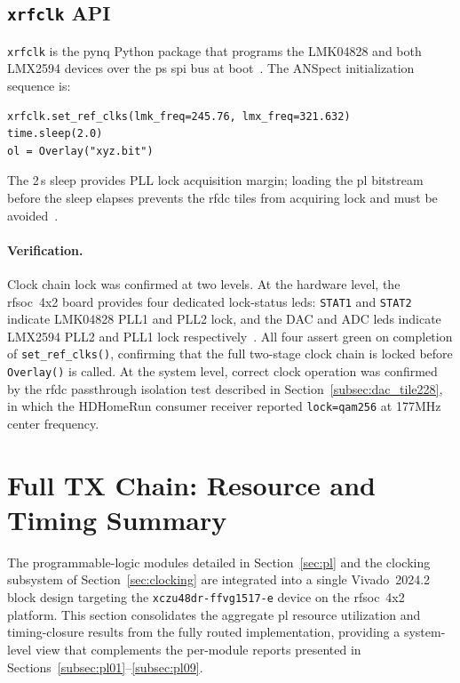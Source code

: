\clearpage
\subsection{\texttt{xrfclk} API}
\label{subsec:xrfclk}

\texttt{xrfclk} is the \ac{pynq} Python package that programs the
LMK04828 and both LMX2594 devices over the \ac{ps} \ac{spi} bus at
boot~\cite{xrfclk}.
The ANSpect initialization sequence is:

\begin{verbatim}
xrfclk.set_ref_clks(lmk_freq=245.76, lmx_freq=321.632)
time.sleep(2.0)
ol = Overlay("xyz.bit")
\end{verbatim}

The 2\,s sleep provides \ac{PLL} lock acquisition margin; loading the
\ac{pl} bitstream before the sleep elapses prevents the \ac{rfdc} tiles
from acquiring lock and must be avoided~\cite{xrfclk}.

\paragraph{Verification.}

Clock chain lock was confirmed at two levels.
At the hardware level, the \ac{rfsoc}~4x2 board provides four dedicated
lock-status \acp{led}: \texttt{STAT1} and \texttt{STAT2} indicate LMK04828
\ac{PLL}1 and \ac{PLL}2 lock, and the DAC and ADC \acp{led} indicate
LMX2594 PLL2 and PLL1 lock respectively~\cite{RealDigital_A6}.
All four assert green on completion of \texttt{set\_ref\_clks()},
confirming that the full two-stage clock chain is locked before
\texttt{Overlay()} is called.
At the system level, correct clock operation was confirmed by the \ac{rfdc}
passthrough isolation test described in Section~\ref{subsec:dac_tile228},
in which the HDHomeRun consumer receiver reported \texttt{lock=qam256}
at 177MHz center frequency.

\clearpage

\section{Full TX Chain: Resource and Timing Summary}
\label{sec:tx_chain_summary}

The programmable-logic modules detailed in Section~\ref{sec:pl}
and the clocking subsystem of Section~\ref{sec:clocking} are integrated
into a single Vivado~2024.2 block design targeting the
\texttt{xczu48dr\allowbreak-ffvg1517\allowbreak-e} device on the \ac{rfsoc}~4x2 platform.
This section consolidates the aggregate \ac{pl} resource utilization and
timing-closure results from the fully routed implementation, providing a
system-level view that complements the per-module reports presented in
Sections~\ref{subsec:pl01}--\ref{subsec:pl09}.

